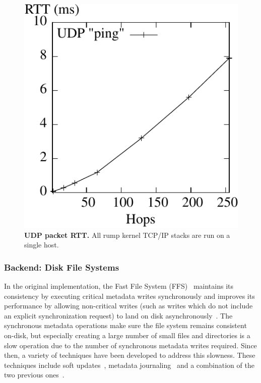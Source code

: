 \begin{figure}[t]
\includegraphics{latency.pdf}
\caption[UDP packet RTT]{
\textbf{UDP packet RTT.}
All rump kernel TCP/IP stacks are run on a single host.
}
\label{fig:cluster}
\end{figure}

\subsubsection{Backend: Disk File Systems}
\label{chap:fsperformance}

In the original implementation, the Fast File System
(FFS)~\cite{mckusick:ffs} maintains its consistency by executing critical
metadata writes synchronously and improves its performance by allowing
non-critical writes (such as writes which do not include an explicit
synchronization request) to land
on disk asynchronously~\cite{mckusick:ffs, daemonbook}.  The synchronous
metadata operations make sure the file system remains consistent on-disk,
but especially creating a large number of small files and directories is a
slow operation due to the number of synchronous metadata writes required.
Since then, a variety of techniques have been developed to address
this slowness.  These techniques include soft
updates~\cite{mckusick:softdep}, metadata journaling~\cite{man4:wapbl}
and a combination of the two previous ones~\cite{mckusick:suj}.

